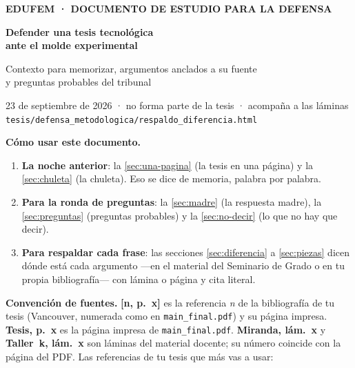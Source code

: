 \documentclass[11pt,a4paper]{article}
\begin{document}
\begin{tcolorbox}[colback=tinta,colframe=tinta,arc=3pt,left=14pt,right=14pt,top=12pt,bottom=12pt,breakable=false]
\color{white}
{\small\textcolor{acento!60!white}{\textbf{EDUFEM · DOCUMENTO DE ESTUDIO PARA LA DEFENSA}}}\par\medskip
{\LARGE\bfseries Defender una tesis tecnológica\\ ante el molde experimental\par}\medskip
{\large Contexto para memorizar, argumentos anclados a su fuente\\ y preguntas probables del tribunal\par}\medskip
{\small 23 de septiembre de 2026 · no forma parte de la tesis · acompaña a las láminas\\ \texttt{tesis/defensa\_metodologica/respaldo\_diferencia.html}\par}
\end{tcolorbox}

\textbf{Cómo usar este documento.}
\begin{enumerate}[leftmargin=1.6em]
\item \textbf{La noche anterior}: la \autoref{sec:una-pagina} (la tesis en una página) y la \autoref{sec:chuleta} (la chuleta). Eso se dice de memoria, palabra por palabra.
\item \textbf{Para la ronda de preguntas}: la \autoref{sec:madre} (la respuesta madre), la \autoref{sec:preguntas} (preguntas probables) y la \autoref{sec:no-decir} (lo que no hay que decir).
\item \textbf{Para respaldar cada frase}: las secciones \ref{sec:diferencia} a \ref{sec:piezas} dicen dónde está cada argumento ---en el material del Seminario de Grado o en tu propia bibliografía--- con lámina o página y cita literal.
\end{enumerate}

\textbf{Convención de fuentes.} \textbf{[n, p.~x]} es la referencia \emph{n} de la bibliografía de tu tesis (Vancouver, numerada como en \texttt{main\_final.pdf}) y su página impresa. \textbf{Tesis, p.~x} es la página impresa de \texttt{main\_final.pdf}. \textbf{Miranda, lám.~x} y \textbf{Taller~k, lám.~x} son láminas del material docente; su número coincide con la página del PDF. Las referencias de tu tesis que más vas a usar:
\end{document}
